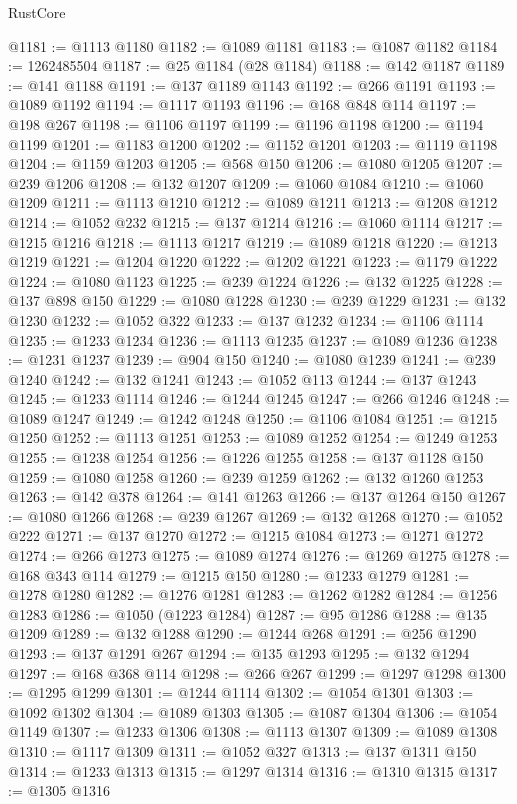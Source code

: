 \begin{lexlean}{RustCore}
\begin{coremodule}
@1181 := @1113 @1180
@1182 := @1089 @1181
@1183 := @1087 @1182
@1184 := 1262485504
@1187 := @25 @1184 (@28 @1184)
@1188 := @142 @1187
@1189 := @141 @1188
@1191 := @137 @1189 @1143
@1192 := @266 @1191
@1193 := @1089 @1192
@1194 := @1117 @1193
@1196 := @168 @848 @114
@1197 := @198 @267
@1198 := @1106 @1197
@1199 := @1196 @1198
@1200 := @1194 @1199
@1201 := @1183 @1200
@1202 := @1152 @1201
@1203 := @1119 @1198
@1204 := @1159 @1203
@1205 := @568 @150
@1206 := @1080 @1205
@1207 := @239 @1206
@1208 := @132 @1207
@1209 := @1060 @1084
@1210 := @1060 @1209
@1211 := @1113 @1210
@1212 := @1089 @1211
@1213 := @1208 @1212
@1214 := @1052 @232
@1215 := @137 @1214
@1216 := @1060 @1114
@1217 := @1215 @1216
@1218 := @1113 @1217
@1219 := @1089 @1218
@1220 := @1213 @1219
@1221 := @1204 @1220
@1222 := @1202 @1221
@1223 := @1179 @1222
@1224 := @1080 @1123
@1225 := @239 @1224
@1226 := @132 @1225
@1228 := @137 @898 @150
@1229 := @1080 @1228
@1230 := @239 @1229
@1231 := @132 @1230
@1232 := @1052 @322
@1233 := @137 @1232
@1234 := @1106 @1114
@1235 := @1233 @1234
@1236 := @1113 @1235
@1237 := @1089 @1236
@1238 := @1231 @1237
@1239 := @904 @150
@1240 := @1080 @1239
@1241 := @239 @1240
@1242 := @132 @1241
@1243 := @1052 @113
@1244 := @137 @1243
@1245 := @1233 @1114
@1246 := @1244 @1245
@1247 := @266 @1246
@1248 := @1089 @1247
@1249 := @1242 @1248
@1250 := @1106 @1084
@1251 := @1215 @1250
@1252 := @1113 @1251
@1253 := @1089 @1252
@1254 := @1249 @1253
@1255 := @1238 @1254
@1256 := @1226 @1255
@1258 := @137 @1128 @150
@1259 := @1080 @1258
@1260 := @239 @1259
@1262 := @132 @1260 @1253
@1263 := @142 @378
@1264 := @141 @1263
@1266 := @137 @1264 @150
@1267 := @1080 @1266
@1268 := @239 @1267
@1269 := @132 @1268
@1270 := @1052 @222
@1271 := @137 @1270
@1272 := @1215 @1084
@1273 := @1271 @1272
@1274 := @266 @1273
@1275 := @1089 @1274
@1276 := @1269 @1275
@1278 := @168 @343 @114
@1279 := @1215 @150
@1280 := @1233 @1279
@1281 := @1278 @1280
@1282 := @1276 @1281
@1283 := @1262 @1282
@1284 := @1256 @1283
@1286 := @1050 (@1223 @1284)
@1287 := @95 @1286
@1288 := @135 @1209
@1289 := @132 @1288
@1290 := @1244 @268
@1291 := @256 @1290
@1293 := @137 @1291 @267
@1294 := @135 @1293
@1295 := @132 @1294
@1297 := @168 @368 @114
@1298 := @266 @267
@1299 := @1297 @1298
@1300 := @1295 @1299
@1301 := @1244 @1114
@1302 := @1054 @1301
@1303 := @1092 @1302
@1304 := @1089 @1303
@1305 := @1087 @1304
@1306 := @1054 @1149
@1307 := @1233 @1306
@1308 := @1113 @1307
@1309 := @1089 @1308
@1310 := @1117 @1309
@1311 := @1052 @327
@1313 := @137 @1311 @150
@1314 := @1233 @1313
@1315 := @1297 @1314
@1316 := @1310 @1315
@1317 := @1305 @1316

\end{coremodule}
\end{lexlean}

